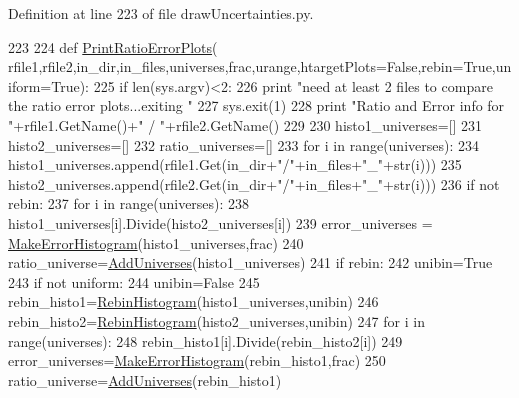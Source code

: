 Definition at line 223 of file draw\-Uncertainties.\-py.


\begin{DoxyCode}
223 
224 \textcolor{keyword}{def }\hyperlink{namespacedraw_uncertainties_aa087fc0e5505d449e4c4c78ba8dc59c5}{PrintRatioErrorPlots}(
      rfile1,rfile2,in\_dir,in\_files,universes,frac,urange,htargetPlots=False,rebin=True,uniform=True):
225     \textcolor{keywordflow}{if} len(sys.argv)<2:
226         \textcolor{keywordflow}{print} \textcolor{stringliteral}{"need at least 2 files to compare the ratio error plots...exiting "}
227         sys.exit(1)
228     \textcolor{keywordflow}{print} \textcolor{stringliteral}{"Ratio and Error info for "}+rfile1.GetName()+\textcolor{stringliteral}{" / "}+rfile2.GetName()
229     
230     histo1\_universes=[]
231     histo2\_universes=[]
232     ratio\_universes=[]
233     \textcolor{keywordflow}{for} i \textcolor{keywordflow}{in} range(universes):
234         histo1\_universes.append(rfile1.Get(in\_dir+\textcolor{stringliteral}{"/"}+in\_files+\textcolor{stringliteral}{"\_"}+str(i)))
235         histo2\_universes.append(rfile2.Get(in\_dir+\textcolor{stringliteral}{"/"}+in\_files+\textcolor{stringliteral}{"\_"}+str(i)))
236     \textcolor{keywordflow}{if} \textcolor{keywordflow}{not} rebin:      
237         \textcolor{keywordflow}{for} i \textcolor{keywordflow}{in} range(universes):
238             histo1\_universes[i].Divide(histo2\_universes[i])
239         error\_universes = \hyperlink{namespacedraw_uncertainties_a71b82db5bc399553d8d56d4d8ce2b18e}{MakeErrorHistogram}(histo1\_universes,frac)
240         ratio\_universe=\hyperlink{namespacedraw_uncertainties_a5f3f19737fb7c47a3c667b8302147051}{AddUniverses}(histo1\_universes)
241     \textcolor{keywordflow}{if} rebin:
242         unibin=\textcolor{keyword}{True}
243         \textcolor{keywordflow}{if} \textcolor{keywordflow}{not} uniform:
244             unibin=\textcolor{keyword}{False}
245         rebin\_histo1=\hyperlink{namespacedraw_uncertainties_a5bc9e5d65362bd3fc2fcf03940d6725f}{RebinHistogram}(histo1\_universes,unibin)
246         rebin\_histo2=\hyperlink{namespacedraw_uncertainties_a5bc9e5d65362bd3fc2fcf03940d6725f}{RebinHistogram}(histo2\_universes,unibin)
247         \textcolor{keywordflow}{for} i \textcolor{keywordflow}{in} range(universes):
248             rebin\_histo1[i].Divide(rebin\_histo2[i])
249         error\_universes=\hyperlink{namespacedraw_uncertainties_a71b82db5bc399553d8d56d4d8ce2b18e}{MakeErrorHistogram}(rebin\_histo1,frac)
250         ratio\_universe=\hyperlink{namespacedraw_uncertainties_a5f3f19737fb7c47a3c667b8302147051}{AddUniverses}(rebin\_histo1)

\end{DoxyCode}
